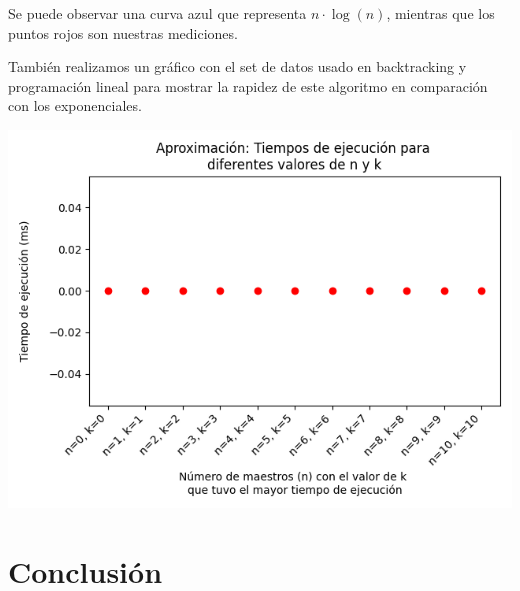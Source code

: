 \documentclass{article}
\begin{document}
Se puede observar una curva azul que representa $n \cdot \log(n)$, mientras que los puntos rojos son nuestras mediciones. 

También realizamos un gráfico con el set de datos usado en backtracking y programación lineal para mostrar la rapidez de este algoritmo en comparación con los exponenciales.

\includegraphics[scale=0.60]{images/graficoAproxAdicionalMediciones.png}

\section{Conclusión}
\end{document}
